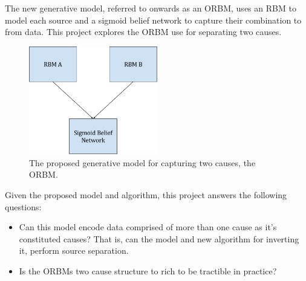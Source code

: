 The new generative model, referred to onwards as an ORBM, uses an RBM to model each source and a sigmoid belief network to capture their combination to from data. This project explores the ORBM use for separating two causes.

\begin{figure}[h]
\begin{center}
  \includegraphics[width = 0.5\textwidth]{Assets/ORBM_fig_1}
\caption{The proposed generative model for capturing two causes, the ORBM.}

\label{F:ORBM-fig-1}
\end{center}
\end{figure}

Given the proposed model and algorithm, this project answers the following questions:
\begin{itemize}
  \item Can this model encode data comprised of more than one cause as it's constituted causes? That is, can the model and new algorithm for inverting it, perform source separation.
  \item Is the ORBMs two cause structure to rich to be tractible in practice?
\end{itemize}
